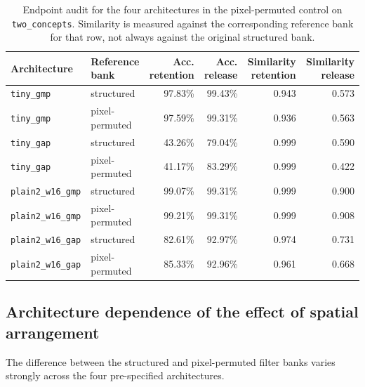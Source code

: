 \begin{table}[h]
\caption{Endpoint audit for the four architectures in the pixel-permuted control on \texttt{two\_concepts}. Similarity is measured against the corresponding reference bank for that row, not always against the original structured bank.}
\label{tab:anchor-endpoints}
\centering
\scriptsize
\setlength{\tabcolsep}{2.5pt}
\begin{tabular}{llrrrr}
\toprule
Architecture & Reference bank & Acc. retention & Acc. release & Similarity retention & Similarity release \\
\midrule
\texttt{tiny\_gmp} & structured & 97.83\% & 99.43\% & 0.943 & 0.573 \\
\texttt{tiny\_gmp} & pixel-permuted & 97.59\% & 99.31\% & 0.936 & 0.563 \\
\texttt{tiny\_gap} & structured & 43.26\% & 79.04\% & 0.999 & 0.590 \\
\texttt{tiny\_gap} & pixel-permuted & 41.17\% & 83.29\% & 0.999 & 0.422 \\
\texttt{plain2\_w16\_gmp} & structured & 99.07\% & 99.31\% & 0.999 & 0.900 \\
\texttt{plain2\_w16\_gmp} & pixel-permuted & 99.21\% & 99.31\% & 0.999 & 0.908 \\
\texttt{plain2\_w16\_gap} & structured & 82.61\% & 92.97\% & 0.974 & 0.731 \\
\texttt{plain2\_w16\_gap} & pixel-permuted & 85.33\% & 92.96\% & 0.961 & 0.668 \\
\bottomrule
\end{tabular}
\end{table}

\subsection{Architecture dependence of the effect of spatial arrangement}\label{app:anchor-architecture}

The difference between the structured and pixel-permuted filter banks varies strongly across the four pre-specified architectures.

